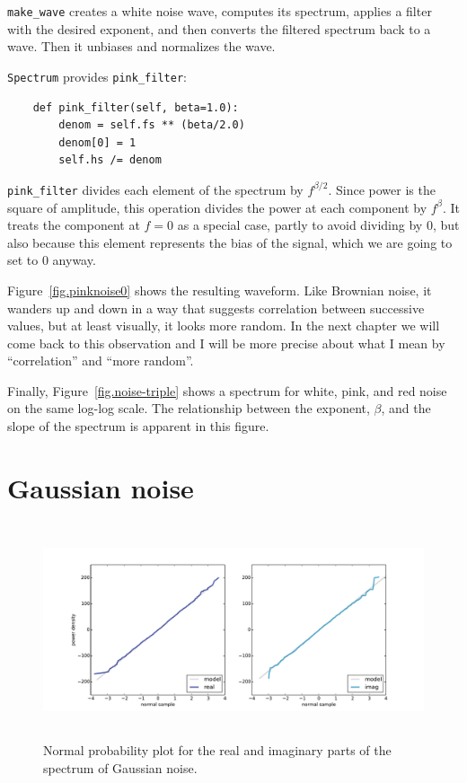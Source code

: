 \documentclass[12pt]{book}
\begin{document}
\verb"make_wave" creates a white noise wave, computes its spectrum,
applies a filter with the desired exponent, and then converts the
filtered spectrum back to a wave.  Then it unbiases and normalizes
the wave.

{\tt Spectrum} provides \verb"pink_filter":

\begin{verbatim}
    def pink_filter(self, beta=1.0):
        denom = self.fs ** (beta/2.0)
        denom[0] = 1
        self.hs /= denom
\end{verbatim}

\verb"pink_filter" divides each element of the spectrum by
$f^{\beta/2}$.  Since power is the square of amplitude, this
operation divides the power at
each component by $f^\beta$.  It treats the component
at $f=0$ as a special case, partly to avoid dividing by 0, but
also because this element represents the bias of the signal,
which we are going to set to 0 anyway. 

Figure~\ref{fig.pinknoise0} shows the resulting waveform.  Like
Brownian noise, it wanders up and down in a way that suggests
correlation between successive values, but at least visually, it looks
more random.  In the next chapter we will come back to this
observation and I will be more precise about what I mean by
``correlation'' and ``more random''.

Finally, Figure~\ref{fig.noise-triple} shows a spectrum for
white, pink, and red noise on the same log-log scale.
The relationship between the exponent, $\beta$, and the slope
of the spectrum is apparent in this figure.


\section{Gaussian noise}

\begin{figure}
\centerline{\includegraphics[height=2.5in]{figs/noise1.pdf}}
\caption{Normal probability plot for the real and imaginary parts
of the spectrum of Gaussian noise.}
\label{fig.noise1}
\end{figure}
\end{document}
